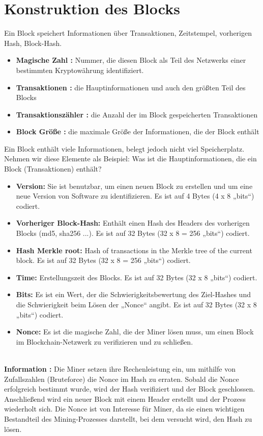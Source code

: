 \documentclass[ngerman]{scrreprt}
\begin{document}
\section{Konstruktion des Blocks}
Ein Block speichert Informationen über Transaktionen, Zeitstempel, vorherigen Hash, Block-Hash.
\begin{itemize}
\item \textbf{Magische Zahl :} Nummer, die diesen Block als Teil des Netzwerks einer bestimmten Kryptowährung identifiziert.
\item \textbf{Transaktionen :} die Hauptinformationen und auch den größten Teil des Blocks
\item \textbf{Transaktionszähler :} die Anzahl der im Block gespeicherten Transaktionen
\item \textbf{Block Größe :} die maximale Größe der Informationen, die der Block enthält
\end{itemize} 
Ein Block enthält viele Informationen, belegt jedoch nicht viel Speicherplatz. Nehmen wir diese Elemente als Beispiel:
Was ist die Hauptinformationen, die ein Block (Transaktionen) enthält?
\begin{itemize}
\item \textbf{Version:} Sie ist benutzbar, um einen neuen Block zu erstellen und um eine neue Version von Software zu identifizieren. Es ist auf 4 Bytes (4 x 8 „bits“) codiert.
\item \textbf{Vorheriger Block-Hash:} Enthält einen Hash des Headers des vorherigen Blocks (md5, sha256 ...). Es ist auf 32 Bytes (32 x 8 = 256 „bits“) codiert.
\item \textbf{Hash Merkle root:} Hash of transactions in the Merkle tree of the current block. Es ist auf 32 Bytes (32 x 8 = 256 „bits“) codiert.
\item \textbf{Time:} Erstellungszeit des Blocks. Es ist auf 32 Bytes (32 x 8 „bits“) codiert.
\item \textbf{Bits:} Es ist ein Wert, der die Schwierigkeitsbewertung des Ziel-Hashes und die Schwierigkeit beim Lösen der „Nonce“ angibt. Es ist auf 32 Bytes (32 x 8 „bits“) codiert.
\item \textbf{Nonce:} Es ist die magische Zahl, die der Miner lösen muss, um einen Block im Blockchain-Netzwerk zu verifizieren und zu schließen.\\ \\
\end{itemize}

\color{green}
\Large{\textbf{Information :}} 
\color{black}
\normalsize
Die Miner setzen ihre Rechenleistung ein, um mithilfe von Zufallszahlen (Bruteforce) die Nonce im Hash zu erraten. Sobald die Nonce erfolgreich bestimmt wurde, wird der Hash verifiziert und der Block geschlossen. Anschließend wird ein neuer Block mit einem Header erstellt und der Prozess wiederholt sich. Die Nonce ist von Interesse für Miner, da sie einen wichtigen Bestandteil des Mining-Prozesses darstellt, bei dem versucht wird, den Hash zu lösen. \\ \\ \\
\end{document}

